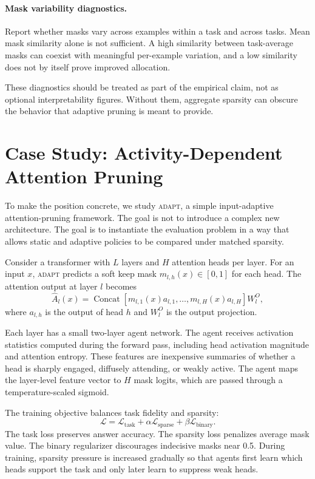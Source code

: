 \documentclass{article}
\newcommand{\method}{\textsc{adapt}}
\begin{document}
\paragraph{Mask variability diagnostics.}
Report whether masks vary across examples within a task and across tasks. Mean
mask similarity alone is not sufficient. A high similarity between task-average
masks can coexist with meaningful per-example variation, and a low similarity
does not by itself prove improved allocation.

These diagnostics should be treated as part of the empirical claim, not as
optional interpretability figures. Without them, aggregate sparsity can obscure
the behavior that adaptive pruning is meant to provide.

\section{Case Study: Activity-Dependent Attention Pruning}

To make the position concrete, we study \method{}, a simple input-adaptive
attention-pruning framework. The goal is not to introduce a complex new
architecture. The goal is to instantiate the evaluation problem in a way that
allows static and adaptive policies to be compared under matched sparsity.

Consider a transformer with $L$ layers and $H$ attention heads per layer. For
an input $x$, \method{} predicts a soft keep mask
$m_{l,h}(x) \in [0,1]$ for each head. The attention output at layer $l$ becomes
\[
  \hat{A}_l(x) =
  \operatorname{Concat}\left[m_{l,1}(x)a_{l,1}, \ldots,
  m_{l,H}(x)a_{l,H}\right] W_l^O,
\]
where $a_{l,h}$ is the output of head $h$ and $W_l^O$ is the output
projection.

Each layer has a small two-layer agent network. The agent receives activation
statistics computed during the forward pass, including head activation
magnitude and attention entropy. These features are inexpensive summaries of
whether a head is sharply engaged, diffusely attending, or weakly active. The
agent maps the layer-level feature vector to $H$ mask logits, which are passed
through a temperature-scaled sigmoid.

The training objective balances task fidelity and sparsity:
\[
  \mathcal{L} =
  \mathcal{L}_{\text{task}} +
  \alpha \mathcal{L}_{\text{sparse}} +
  \beta \mathcal{L}_{\text{binary}}.
\]
The task loss preserves answer accuracy. The sparsity loss penalizes average
mask value. The binary regularizer discourages indecisive masks near 0.5.
During training, sparsity pressure is increased gradually so that agents first
learn which heads support the task and only later learn to suppress weak heads.
\end{document}
